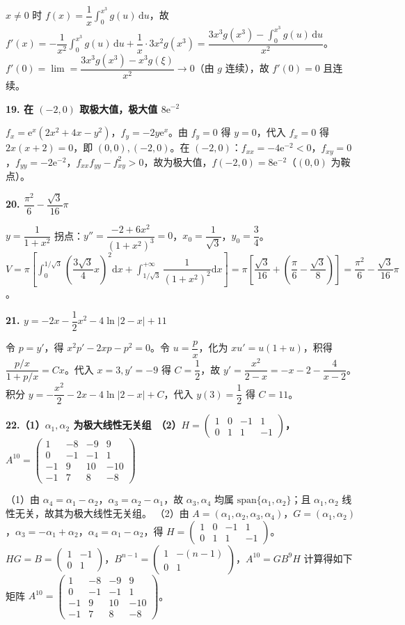 \documentclass[UTF8,11pt]{ctexart}
\begin{document}
$x\neq0$ 时 $f(x)=\dfrac1x\int_0^{x^3}g(u)\,\mathrm{d}u$，故 $f'(x)=-\dfrac1{x^2}\int_0^{x^3}g(u)\,\mathrm{d}u+\dfrac1x\cdot3x^2g(x^3)=\dfrac{3x^3g(x^3)-\int_0^{x^3}g(u)\,\mathrm{d}u}{x^2}$。$f'(0)=\lim=\dfrac{3x^3g(x^3)-x^3g(\xi)}{x^2}\to0$（由 $g$ 连续），故 $f'(0)=0$ 且连续。
\par\noindent\textbf{19. 在 $(-2,0)$ 取极大值，极大值 $8\mathrm{e}^{-2}$}\par
$f_x=\mathrm{e}^x(2x^2+4x-y^2)$，$f_y=-2y\mathrm{e}^x$。由 $f_y=0$ 得 $y=0$，代入 $f_x=0$ 得 $2x(x+2)=0$，即 $(0,0),(-2,0)$。在 $(-2,0)$：$f_{xx}=-4\mathrm{e}^{-2}<0$，$f_{xy}=0$，$f_{yy}=-2\mathrm{e}^{-2}$，$f_{xx}f_{yy}-f_{xy}^2>0$，故为极大值，$f(-2,0)=8\mathrm{e}^{-2}$（$(0,0)$ 为鞍点）。
\par\noindent\textbf{20. $\dfrac{\pi^2}{6}-\dfrac{\sqrt3}{16}\pi$}\par
$y=\dfrac1{1+x^2}$ 拐点：$y''=\dfrac{-2+6x^2}{(1+x^2)^3}=0$，$x_0=\dfrac1{\sqrt3}$，$y_0=\dfrac34$。$V=\pi\left[\int_0^{1/\sqrt3}\left(\dfrac{3\sqrt3}{4}x\right)^2\mathrm{d}x+\int_{1/\sqrt3}^{+\infty}\dfrac{1}{(1+x^2)^2}\mathrm{d}x\right]=\pi\left[\dfrac{\sqrt3}{16}+\left(\dfrac\pi6-\dfrac{\sqrt3}{8}\right)\right]=\dfrac{\pi^2}{6}-\dfrac{\sqrt3}{16}\pi$。
\par\noindent\textbf{21. $y=-2x-\dfrac12x^2-4\ln|2-x|+11$}\par
令 $p=y'$，得 $x^2p'-2xp-p^2=0$。令 $u=\dfrac px$，化为 $xu'=u(1+u)$，积得 $\dfrac{p/x}{1+p/x}=Cx$。代入 $x=3,y'=-9$ 得 $C=\dfrac12$，故 $y'=\dfrac{x^2}{2-x}=-x-2-\dfrac4{x-2}$。积分 $y=-\dfrac{x^2}{2}-2x-4\ln|2-x|+C$，代入 $y(3)=\dfrac12$ 得 $C=11$。
\par\noindent\textbf{22.（1）$\alpha_1,\alpha_2$ 为极大线性无关组　（2）$H=\begin{pmatrix}1&0&-1&1\\0&1&1&-1\end{pmatrix}$，$A^{10}=\begin{pmatrix}1&-8&-9&9\\0&-1&-1&1\\-1&9&10&-10\\-1&7&8&-8\end{pmatrix}$}\par
（1）由 $\alpha_4=\alpha_1-\alpha_2$，$\alpha_3=\alpha_2-\alpha_1$，故 $\alpha_3,\alpha_4$ 均属 $\mathrm{span}\{\alpha_1,\alpha_2\}$；且 $\alpha_1,\alpha_2$ 线性无关，故其为极大线性无关组。
（2）由 $A=(\alpha_1,\alpha_2,\alpha_3,\alpha_4)$，$G=(\alpha_1,\alpha_2)$，$\alpha_3=-\alpha_1+\alpha_2$，$\alpha_4=\alpha_1-\alpha_2$，得 $H=\begin{pmatrix}1&0&-1&1\\0&1&1&-1\end{pmatrix}$。$HG=B=\begin{pmatrix}1&-1\\0&1\end{pmatrix}$，$B^{n-1}=\begin{pmatrix}1&-(n-1)\\0&1\end{pmatrix}$，$A^{10}=GB^9H$ 计算得如下矩阵
$A^{10}=\begin{pmatrix}1&-8&-9&9\\0&-1&-1&1\\-1&9&10&-10\\-1&7&8&-8\end{pmatrix}$。
\end{document}
